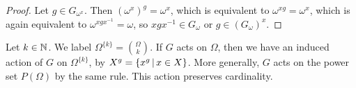 \begin{proof}
  Let $g \in G_{\omega^x}$.
  Then $(\omega^x)^g = \omega^x$, which is equivalent to $\omega^{xg} =
  \omega^x$, which is again equivalent to $\omega^{x g x^{-1}} = \omega$, so $xg
  x^{-1} \in G_\omega$ or $g \in (G_\omega)^x$.
\end{proof}

\begin{example}
  Let $k \in \mathbb{N}$. We label $\Omega^{\{k\}} = \binom{\Omega}{k}$. If $G$ acts on
  $\Omega$, then we have an induced action of $G$ on $\Omega^{\{k\}}$, by $X^g =
  \{ x^g \,|\, x \in X \}$.
  More generally, $G$ acts on the power set $P(\Omega)$ by the same rule.
  This action preserves cardinality.
\end{example}


